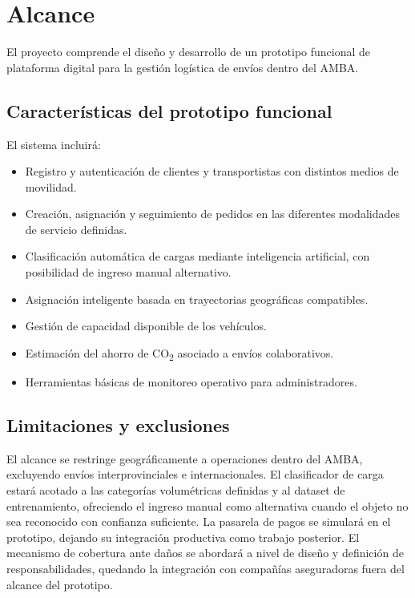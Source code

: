 \section{Alcance}

El proyecto comprende el diseño y desarrollo de un prototipo funcional de plataforma digital para la gestión logística de envíos dentro del AMBA.

\subsection{Características del prototipo funcional}

El sistema incluirá:

\begin{itemize}[leftmargin=2em]
    \item Registro y autenticación de clientes y transportistas con distintos medios de movilidad.
    
    \item Creación, asignación y seguimiento de pedidos en las diferentes modalidades de servicio definidas.
    
    \item Clasificación automática de cargas mediante inteligencia artificial, con posibilidad de ingreso manual alternativo.
    
    \item Asignación inteligente basada en trayectorias geográficas compatibles.
    
    \item Gestión de capacidad disponible de los vehículos.
    
    \item Estimación del ahorro de CO\textsubscript{2} asociado a envíos colaborativos.
    
    \item Herramientas básicas de monitoreo operativo para administradores.
\end{itemize}

\subsection{Limitaciones y exclusiones}

El alcance se restringe geográficamente a operaciones dentro del AMBA, excluyendo envíos interprovinciales e internacionales. El clasificador de carga estará acotado a las categorías volumétricas definidas y al dataset de entrenamiento, ofreciendo el ingreso manual como alternativa cuando el objeto no sea reconocido con confianza suficiente. La pasarela de pagos se simulará en el prototipo, dejando su integración productiva como trabajo posterior. El mecanismo de cobertura ante daños se abordará a nivel de diseño y definición de responsabilidades, quedando la integración con compañías aseguradoras fuera del alcance del prototipo.

